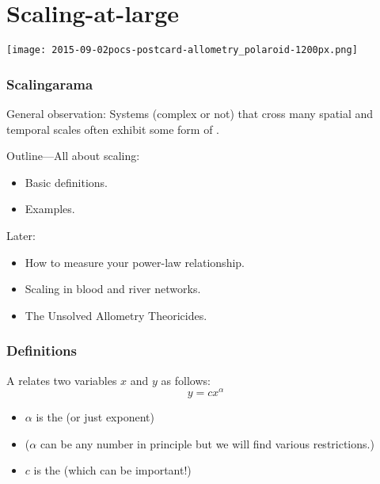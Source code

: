 \section{Scaling-at-large}

\begin{frame}
  \texttt{[image: 2015-09-02pocs-postcard-allometry\_polaroid-1200px.png]}
\end{frame}

\begin{frame}
  \frametitle{Scalingarama}

  \begin{block}{General observation:}
    Systems (complex or not) 
    that cross many spatial and temporal scales
    often exhibit some form of .
  \end{block}

  \begin{block}{Outline---All about scaling:}
    \begin{itemize}
    \item<1->
      Basic definitions.
    \item<2->
      Examples.
    \end{itemize}
  \end{block}

  \begin{block}{Later:}
    \begin{itemize}
    \item<3->
      How to measure your power-law relationship.
    \item<4->
      Scaling in blood and river networks.
    \item<5->
      The Unsolved Allometry Theoricides.
    \end{itemize}
  \end{block}

\end{frame}


\begin{frame}
  \frametitle{Definitions}

  \begin{block}{}
    A  relates two
    variables $x$ and $y$ as follows:
    {\Large
      $$ y = c x^\alpha $$
    }
  \end{block}

  \begin{block}{}
    \begin{itemize}
    \item 
      $\alpha$ is the  (or just exponent)
    \item 
      ($\alpha$ can be any number in principle but we will
      find various restrictions.)
    \item 
      $c$ is the  (which can be important!)
    \end{itemize}
  \end{block}

\end{frame}

